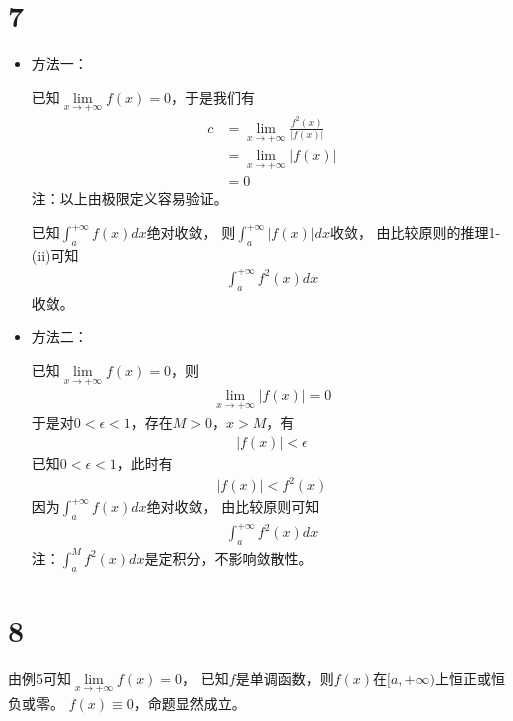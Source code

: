 \documentclass{article}
\begin{document}
\section*{7}
\begin{itemize}
  \item 方法一：

        已知$\lim\limits_{x \to +\infty} f(x) = 0$，于是我们有
        \begin{align*}
          c & = \lim\limits_{x \to +\infty} \frac{f^2(x)}{|f(x)|} \\
            & = \lim\limits_{x \to +\infty} |f(x)|                \\
            & = 0
        \end{align*}
        注：以上由极限定义容易验证。

        已知$\int_{a}^{+\infty} f(x) dx$绝对收敛，
        则$\int_{a}^{+\infty} |f(x)| dx$收敛，
        由比较原则的推理1-(ii)可知
        \begin{align*}
          \int_{a}^{+\infty} f^2(x) dx
        \end{align*}
        收敛。

  \item 方法二：

        已知$\lim\limits_{x \to +\infty} f(x) = 0$，则
        \begin{align*}
          \lim\limits_{x \to +\infty} |f(x)| = 0
        \end{align*}
        于是对$0 < \epsilon < 1$，存在$M > 0$，$x > M$，有
        \begin{align*}
          |f(x)| < \epsilon
        \end{align*}
        已知$0 < \epsilon < 1$，此时有
        \begin{align*}
          |f(x)| < f^2(x)
        \end{align*}
        因为$\int_{a}^{+\infty} f(x) dx$绝对收敛，
        由比较原则可知
        \begin{align*}
          \int_{a}^{+\infty} f^2(x) dx
        \end{align*}
        注：$\int_{a}^{M} f^2(x) dx$是定积分，不影响敛散性。

\end{itemize}

\section*{8}

由例5可知$\lim \limits_{x \to +\infty} f(x) = 0$，
已知$f$是单调函数，则$f(x)$在$[a, +\infty)$上恒正或恒负或零。
$f(x) \equiv 0$，命题显然成立。
\end{document}
